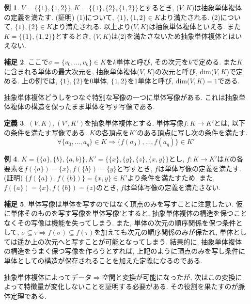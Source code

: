 \documentclass[a4paper]{jsarticle}
\theoremstyle{definition}
\newtheorem{dfn}{定義}[section]
\newtheorem{exam}[dfn]{例}
\newtheorem{hsk}[dfn]{補足}
\begin{document}
\begin{exam}
    $V=\{ \{1\}, \{1,2\}\}, K=\{\{1\}, \{2\}, \{1,2\} \}$とするとき, ($V,K$)は抽象単体複体の定義を満たす. (証明) (1)について, $\{1\}, \{1,2\}\in K$より満たされる. (2)について, $\{1\}, \{2\}\in K$より満たされる. 以上より($V,K$)は抽象単体複体といえる. また$K=\{\{1\}, \{1,2\} \}$とするとき, ($V,K$)は(2)を満たさないため抽象単体複体とはいえない.
\end{exam}
\begin{hsk}
    ここで$\sigma=\{v_0,...,v_k\}\in K$を$k$単体と呼び, その次元を$k$で定める. また$K$に含まれる単体の最大次元を, 抽象単体複体($V,K$)の次元と呼び, dim($V,K$)で定める. 上の例では, $\{1\}, \{2\}$を0単体, $\{1,2\}$を1単体と呼び, dim($V,K$)$=1$である.\\
\end{hsk}
抽象単体複体どうしをつなぐ特別な写像の一つに単体写像がある. これは抽象単体複体の構造を保ったまま単体を写す写像である.
\begin{dfn}
    $(V, K), (V', K')$を抽象単体複体とする. 単体写像$f:K\rightarrow K'$とは, 以下の条件を満たす写像である. $K$の各頂点を$K'$のある頂点に写し次の条件を満たす. 
\begin{equation}
    \forall \{a_0,...,a_q\}\in K\Rightarrow \{f(a_0),...,f(a_q)\}\in K'
\end{equation}
\end{dfn}
\begin{exam}
    $K=\{ \{a\}, \{b\}, \{a,b\}\}, K'=\{ \{x\},\{y\}, \{z\}, \{x,y\}\}$とし, $f:K\rightarrow K'$は$K$の各要素を$f(\{a\})=\{x\}, f(\{b\})=\{y\}$と写すとき, $f$は単体写像の定義を満たす. (証明) $\{f(\{a\}), f(\{b\})\}=\{x,y\}\in K'$より条件を満たすため. また, $f(\{a\})=\{x\}, f(\{b\})=\{z\}$のとき, $f$は単体写像の定義を満たさない.
\end{exam}
\begin{hsk}
    単体写像は単体を写すのではなく頂点のみを写すことに注意したい. 仮に単体そのものを写す写像を単体写像'とすると, 抽象単体複体の構造を保つことなくその写像は機能を失ってしまう. また, 単体の次元の順序関係を保つ条件として, $\sigma\subseteq\tau \Rightarrow f(\sigma) \subseteq f(\tau)$を加えても次元の順序関係のみが保たれ, 単体としては遥か上の次元へと写すことが可能となってしまう. 結果的に, 抽象単体複体の構造をうまく保つ写像を作ろうとすれば, 上記のように頂点のみを写し条件に単体としての構造が保存されることを加えた定義になるのである.\\
\end{hsk}

抽象単体複体によってデータ$\Rightarrow$空間と変換が可能になったが, 次はこの変換によって特徴量が変化しないことを証明する必要がある. その役割を果たすのが脈体定理である.
 
\end{document}

